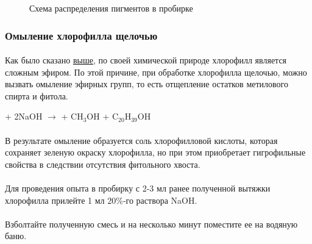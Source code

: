 \begin{figure}[h!]
\label{pigments_separation}
\caption{Схема распределения пигментов в пробирке}
\end{figure}

\subsubsection*{Омыление хлорофилла щелочью}

\paragraph*{}Как было сказано \hyperlink{chlorophilus_eterus}{выше}, по своей химической природе хлорофилл является сложным эфиром. По этой причине,  при обработке хлорофилла щелочью, можно вызвать омыление эфирных групп, то есть отщепление остатков метилового спирта и фитола.

 + 2NaOH $\rightarrow$  +  CH$_{3}$OH + C$_{20}$H$_{39}$OH


\paragraph*{}В результате омыление образуется соль хлорофилловой кислоты, которая сохраняет зеленую окраску хлорофилла, но при этом приобретает гигрофильные свойства в следствии  отсутствия фитольного хвоста.  

\paragraph*{}Для проведения опыта в пробирку с 2-3 мл ранее полученной вытяжки хлорофилла прилейте 1 мл 20\%-го раствора NaOH.

\paragraph*{}Взболтайте полученную смесь и на несколько минут поместите ее на водяную баню.

